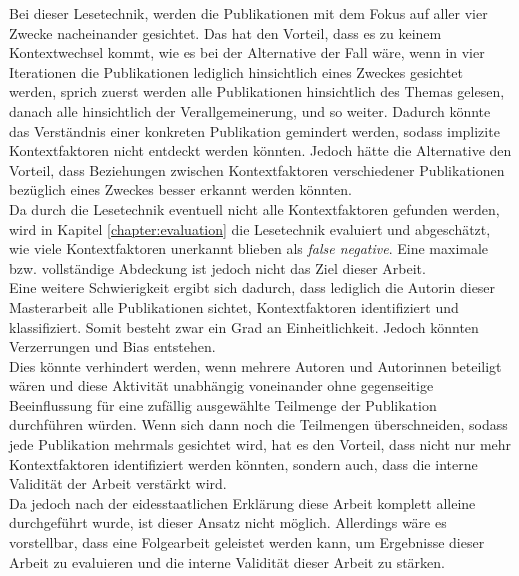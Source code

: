 Bei dieser Lesetechnik, werden die Publikationen mit dem Fokus auf aller vier Zwecke nacheinander gesichtet. Das hat den Vorteil, dass es zu keinem Kontextwechsel kommt, wie es bei der Alternative der Fall wäre, wenn in vier Iterationen die Publikationen lediglich hinsichtlich eines Zweckes gesichtet werden, sprich zuerst werden alle Publikationen hinsichtlich des Themas gelesen, danach alle hinsichtlich der Verallgemeinerung, und so weiter. Dadurch könnte das Verständnis einer konkreten Publikation gemindert werden, sodass implizite Kontextfaktoren nicht entdeckt werden könnten. Jedoch hätte die Alternative den Vorteil, dass Beziehungen zwischen Kontextfaktoren verschiedener Publikationen bezüglich eines Zweckes besser erkannt werden könnten. \\

Da durch die Lesetechnik eventuell nicht alle Kontextfaktoren gefunden werden, wird in Kapitel \ref{chapter:evaluation} die Lesetechnik evaluiert und abgeschätzt, wie viele Kontextfaktoren unerkannt blieben als \textit{false negative}. Eine maximale bzw. vollständige Abdeckung ist jedoch nicht das Ziel dieser Arbeit. \\

Eine weitere Schwierigkeit ergibt sich dadurch, dass lediglich die Autorin dieser Masterarbeit alle Publikationen sichtet, Kontextfaktoren identifiziert und klassifiziert. Somit besteht zwar ein Grad an Einheitlichkeit. Jedoch könnten Verzerrungen und Bias entstehen. \\
Dies könnte verhindert werden, wenn mehrere Autoren und Autorinnen beteiligt wären und diese Aktivität unabhängig voneinander ohne gegenseitige Beeinflussung für eine zufällig ausgewählte Teilmenge der Publikation durchführen würden. Wenn sich dann noch die Teilmengen überschneiden, sodass jede Publikation mehrmals gesichtet wird, hat es den Vorteil, dass nicht nur mehr Kontextfaktoren identifiziert werden könnten, sondern auch, dass die interne Validität der Arbeit verstärkt wird. \\
Da jedoch nach der eidesstaatlichen Erklärung diese Arbeit komplett alleine durchgeführt wurde, ist dieser Ansatz nicht möglich. Allerdings wäre es vorstellbar, dass eine Folgearbeit geleistet werden kann, um Ergebnisse dieser Arbeit zu evaluieren und die interne Validität dieser Arbeit zu stärken. \\


